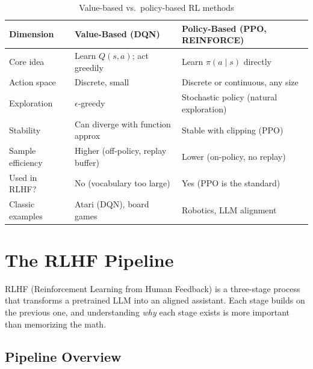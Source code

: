 \begin{table}[H]
\centering
\caption{Value-based vs.\ policy-based RL methods}
\begin{tabularx}{\textwidth}{lXX}
\toprule
\textbf{Dimension} & \textbf{Value-Based (DQN)} & \textbf{Policy-Based (PPO, REINFORCE)} \\
\midrule
Core idea & Learn $Q(s,a)$; act greedily & Learn $\pi(a \mid s)$ directly \\
Action space & Discrete, small & Discrete or continuous, any size \\
Exploration & $\epsilon$-greedy & Stochastic policy (natural exploration) \\
Stability & Can diverge with function approx & Stable with clipping (PPO) \\
Sample efficiency & Higher (off-policy, replay buffer) & Lower (on-policy, no replay) \\
Used in RLHF? & No (vocabulary too large) & Yes (PPO is the standard) \\
Classic examples & Atari (DQN), board games & Robotics, LLM alignment \\
\bottomrule
\end{tabularx}
\end{table}

\section{The RLHF Pipeline}
\label{sec:rlhf_pipeline}

RLHF (Reinforcement Learning from Human Feedback) is a three-stage process that transforms a pretrained LLM into an aligned assistant. Each stage builds on the previous one, and understanding \textit{why} each stage exists is more important than memorizing the math.

\subsection{Pipeline Overview}

